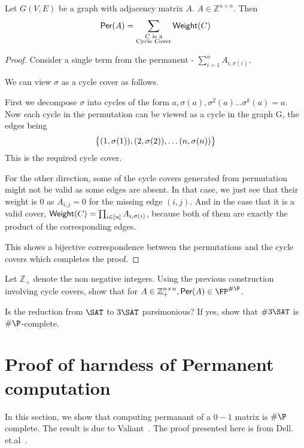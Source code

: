 \begin{lemma}
Let $G(V,E)$ be a graph with adjacency matrix $A$. 
$A \in \mathbb{Z}^{n\times n}$. Then 
\begin{equation}
	{\sf Per}(A) = \sum_{\substack{C \text{ is a} \\ \text{Cycle Cover}}} {\sf Weight}(C)
\end{equation}
\end{lemma}
\begin{proof}
Consider a single term from the permanent - $\sum^n_{i=1}A_{i,\sigma(i)}$.

We can view $\sigma$ as a cycle cover as follows. 

First we decompose $\sigma$ into cycles of the form $a, \sigma(a),
\sigma^2(a)\dots \sigma^k(a) = a$. Now each cycle in the permutation can be
viewed as a cycle in the graph G, the edges being 
\[ \big{\{} (1, \sigma(1)),(2, \sigma(2)), \dots (n, \sigma(n)) \big{\}} \]
This is the required cycle cover. 

For the other direction, some of the cycle covers generated from permutation
might not be valid as some edges are absent. In that case, we just see that 
their weight is 0 as $A_{i,j} = 0$ for the missing edge $(i,j)$. And in the 
case that it is a valid cover, ${\sf Weight}(C) = \prod_{i\in[n]}A_{i,\sigma(i)}$, because both of them are exactly the product of the corresponding edges.

This shows a bijective correspondence between the permutations and the cycle
covers which completes the proof.
\end{proof}


\begin{exercise}
Let $\mathbb{Z}_+$ denote the non negative integers.
Using the previous construction involving cycle covers, 
show that for $A\in \mathbb{Z}_{+}^{n\times n}, \per(A)\in \FP^{\sP}$.

\end{exercise}


\begin{exercise}
Is the reduction from $\SAT$ to $3\SAT$ parsimonious? If yes, show that
$\#3\SAT$ is $\sP$-complete. 
\end{exercise}

\section{Proof of harndess of Permanent computation}
In this section, we show that computing permanant of a $0-1$ matrix is $\sP$
complete. The result is due to Valiant~\cite{valiant79}. The proof presented
here is from Dell. et.al~\cite{dell12}. 

